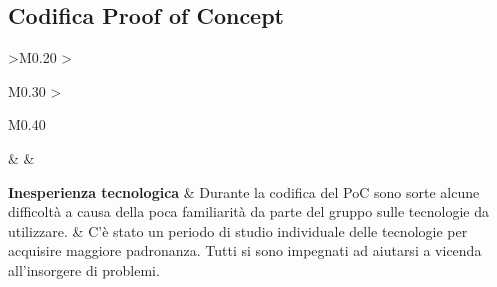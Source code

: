 \subsection{Codifica Proof of Concept}
\begin{longtable}{ 
	>{\centering}M{0.20\textwidth} 
	>{\raggedright}M{0.30\textwidth}
	>{\raggedright}M{0.40\textwidth}
	}
	\rowcolorhead
	\centering 
	 &	
	 &
	\endfirsthead	
	\endhead
	
	\textbf{Inesperienza tecnologica} & 
    Durante la codifica del PoC sono sorte alcune difficoltà a causa della poca
    familiarità da parte del gruppo sulle tecnologie da utilizzare. & 
    C'è stato un periodo di studio individuale delle tecnologie per acquisire maggiore padronanza. 
    Tutti si sono impegnati ad aiutarsi a vicenda all'insorgere di problemi. \tabularnewline
	\captionline \caption{Attualizzazione dei rischi nel periodo di Codifica Proof of Concept}
\end{longtable}
